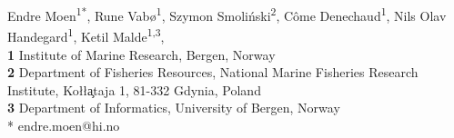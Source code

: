 \documentclass[10pt,letterpaper]{article}
\begin{document}
\vspace*{0.2in}

\begin{flushleft}
{\Large
\textbf{}
}
\newline


Endre Moen\textsuperscript{1*},
Rune Vabø\textsuperscript{1},
Szymon Smoliński\textsuperscript{2},
Côme Denechaud\textsuperscript{1},
Nils Olav Handegard\textsuperscript{1},
Ketil Malde\textsuperscript{1,3},
\\
\bigskip
\textbf{1} Institute of Marine Research, Bergen, Norway
\\
\textbf{2} Department of Fisheries Resources, National Marine Fisheries Research Institute, Ko\l{}\l{}\c ataja 1, 81-332 Gdynia, Poland
\\
\textbf{3} Department of Informatics, University of Bergen, Norway
\\
\bigskip
* endre.moen@hi.no

\end{flushleft}

\linenumbers
\end{document}
